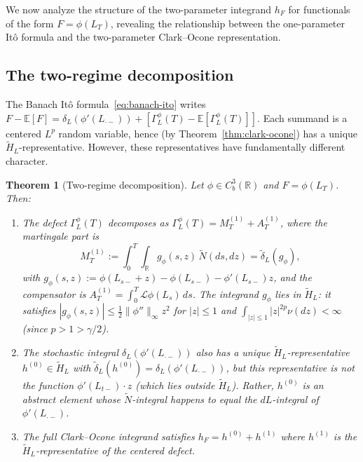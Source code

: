 \documentclass[11pt,a4paper]{article}
\theoremstyle{plain}
\newtheorem{theorem}{Theorem}[section]
\theoremstyle{definition}
\theoremstyle{remark}
\newcommand{\E}{\mathbb{E}}
\newcommand{\R}{\mathbb{R}}
\begin{document}
We now analyze the structure of the two-parameter integrand
$h_F$ for functionals of the form $F = \phi(L_T)$, revealing
the relationship between the one-parameter It\^o formula and
the two-parameter Clark--Ocone representation.

\subsection{The two-regime decomposition}

The Banach It\^o formula~\eqref{eq:banach-ito} writes
$F - \E[F] = \delta_L(\phi'(L_{\cdot-}))
+ [\Gamma_L^{\phi}(T) - \E[\Gamma_L^{\phi}(T)]]$.
Each summand is a centered $L^p$ random variable,
hence (by Theorem~\ref{thm:clark-ocone}) has a unique
$\widetilde{H}_L$-representative.  However, these
representatives have fundamentally different character.

\begin{theorem}[Two-regime decomposition]\label{thm:defect-decomposition}
Let $\phi \in C_b^3(\R)$ and $F = \phi(L_T)$.  Then:
\begin{enumerate}[label=(\alph*)]
\item The defect $\Gamma_L^\phi(T)$ decomposes as
  $\Gamma_L^\phi(T) = M_T^{(1)} + A_T^{(1)}$, where
  the martingale part is
  \begin{equation}\label{eq:defect-martingale}
    M_T^{(1)} := \int_0^T\!\!\int_{\R}
    g_\phi(s,z)\,\widetilde{N}(ds,dz)
    = \widetilde{\delta}_L(g_\phi),
  \end{equation}
  with $g_\phi(s,z) :=
  \phi(L_{s-}+z) - \phi(L_{s-}) - \phi'(L_{s-})z$,
  and the compensator is
  $A_T^{(1)} = \int_0^T\mathcal{L}\phi(L_s)\,ds$.
  The integrand $g_\phi$ lies in $\widetilde{H}_L$:
  it satisfies $|g_\phi(s,z)| \leq
  \tfrac{1}{2}\|\phi''\|_\infty z^2$ for $|z|\leq 1$
  and $\int_{|z|\leq 1}|z|^{2p}\nu(dz) < \infty$
  (since $p > 1 > \gamma/2$).
\item The stochastic integral
  $\delta_L(\phi'(L_{\cdot-}))$ also has a unique
  $\widetilde{H}_L$-representative $h^{(0)} \in
  \widetilde{H}_L$ with $\widetilde{\delta}_L(h^{(0)})
  = \delta_L(\phi'(L_{\cdot-}))$, but this representative
  is \emph{not} the function $\phi'(L_{t-})\cdot z$
  (which lies outside $\widetilde{H}_L$).
  Rather, $h^{(0)}$ is an abstract element whose
  $\widetilde{N}$-integral happens to equal
  the $dL$-integral of $\phi'(L_{\cdot-})$.
\item The full Clark--Ocone integrand satisfies
  $h_F = h^{(0)} + h^{(1)}$ where $h^{(1)}$ is the
  $\widetilde{H}_L$-representative of the centered defect.
\end{enumerate}
\end{theorem}
\end{document}

